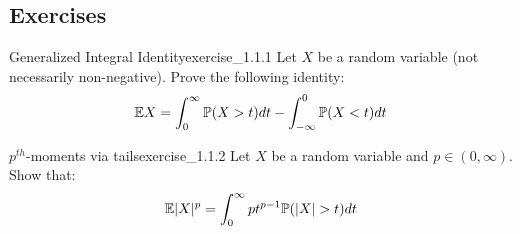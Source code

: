 \noindent\subsection*{Exercises}
\begin{exercise}{Generalized Integral Identity}{exercise_1.1.1}
    Let $X$ be a random variable (not necessarily non-negative). Prove the following identity:
    \begin{align}
        \mathbb{E} X = \int_0^\infty \mathbb{P}(X > t)dt - \int_{-\infty}^0 \mathbb{P} (X<t)dt
    \end{align}
\end{exercise}

\begin{solution*}

\end{solution*}

\begin{exercise}{$p^{th}$-moments via tails}{exercise_1.1.2}
    Let $X$ be a random variable and $p\in(0,\infty)$. Show that:
    \begin{align}
        \mathbb{E}|X|^p = \int_0^\infty pt^{p-1}\mathbb{P}(|X| > t)dt
    \end{align}
\end{exercise}

\begin{solution*}
    
\end{solution*}

